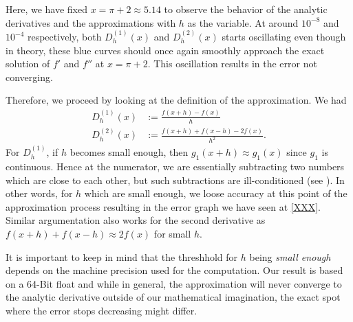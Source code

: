 Here, we have fixed \(x = \pi + 2 \approx 5.14\) to observe the behavior of the analytic derivatives and the approximations with \(h\) as the variable. At around \(10^{-8}\) and \(10^{-4}\) respectively, both \(D^{(1)}_h(x)\) and \(D^{(2)}_h(x)\) starts oscillating even though in theory, these blue curves should once again smoothly approach the exact solution of \(f'\) and \(f''\) at \(x = \pi + 2\). This oscillation results in the error not converging.

Therefore, we proceed by looking at the definition of the approximation. We had
\begin{align*}
    D^{(1)}_h(x) &:= \frac{f(x + h) - f(x)}{h} \\
    D^{(2)}_h(x) &:= \frac{f(x + h) + f(x - h)- 2 f(x)}{h^2} \text{.}
\end{align*}
For \(D^{(1)}_h\), if \(h\) becomes small enough, then \(g_1(x + h) \approx g_1(x)\) since \(g_1\) is continuous. Hence at the numerator, we are essentially subtracting two numbers which are close to each other, but such subtractions are ill-conditioned (see \cite{Lecture}). In other words, for \(h\) which are small enough, we loose accuracy at this point of the approximation process resulting in the error graph we have seen at \ref{XXX}. Similar argumentation also works for the second derivative as \(f(x + h) + f(x - h) \approx 2 f(x)\) for small \(h\).

It is important to keep in mind that the threshhold for \(h\) being \textit{small enough} depends on the machine precision used for the computation. Our result is based on a 64-Bit float and while in general, the approximation will never converge to the analytic derivative outside of our mathematical imagination, the exact spot where the error stops decreasing might differ.